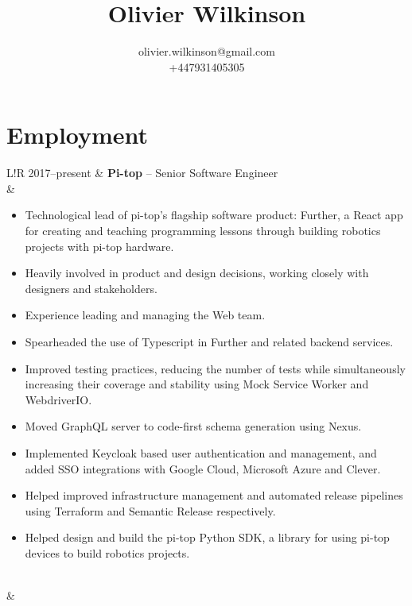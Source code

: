 \documentclass[a4paper,12pt]{article}
\title{\bfseries\Huge Olivier Wilkinson}
\author{olivier.wilkinson@gmail.com\\+447931405305}
\date{} %
\newcommand\VerticalRule{\color{lightgray}\vrule width 0.5pt}
\begin{document}
\maketitle

\section*{Employment}
\begin{tabular}{L!{\VerticalRule}R}
	2017--present & {\bf Pi-top} -- Senior Software Engineer                                                                                                                                                                                       \\
	              & \begin{itemize}
		                \item Technological lead of pi-top's flagship software product: Further, a React app for creating and teaching programming lessons through building robotics projects with pi-top hardware.
		                \item Heavily involved in product and design decisions, working closely with designers and stakeholders.
		                \item Experience leading and managing the Web team.
		                \item Spearheaded the use of Typescript in Further and related backend services.
						\item Improved testing practices, reducing the number of tests while simultaneously increasing their coverage and stability using Mock Service Worker and WebdriverIO.
						\item Moved GraphQL server to code-first schema generation using Nexus.
						\item Implemented Keycloak based user authentication and management, and added SSO integrations with Google Cloud, Microsoft Azure and Clever.
						\item Helped improved infrastructure management and automated release pipelines using Terraform and Semantic Release respectively.
		                \item Helped design and build the pi-top Python SDK, a library for using pi-top devices to build robotics projects.
	                \end{itemize} \\
	              &                                                                                                                                                                                                                                \\


\end{tabular}
\end{document}
